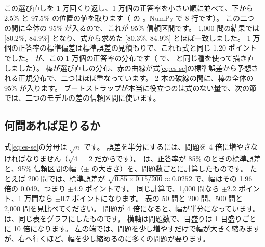 この選び直しを 1 万回くり返し、1 万個の正答率を小さい順に並べて、下から 2.5\% と 97.5\% の位置の値を取ります（ の 。NumPy で 8 行です）。
この二つの間に全体の 95\% が入るので、これが 95\% 信頼区間です。
1,000 問の結果では [80.2\%, 84.9\%] となり、式から求めた [80.3\%, 84.9\%] とほぼ一致しました。
1 万個の正答率の標準偏差は標準誤差の見積もりで、これも式と同じ 1.20 ポイントでした。
が、この 1 万個の正答率の分布です（ で、 と同じ種を使って描き直しました）。
棒が選び直しの分布、赤の曲線が式\eqref{eq:es-se}の標準誤差から予想される正規分布で、二つはほぼ重なっています。
2 本の破線の間に、棒の全体の 95\% が入ります。
ブートストラップが本当に役立つのは式のない量で、次の節では、二つのモデルの差の信頼区間に使います。

\subsection*{何問あれば足りるか}

式\eqref{eq:es-se}の分母は $\sqrt{n}$ です。
誤差を半分にするには、問題を 4 倍に増やさなければなりません（$\sqrt4=2$ だからです）。
は、正答率が 85\% のときの標準誤差と、95\% 信頼区間の幅（$\pm$ の大きさ）を、問題数ごとに計算したものです。
たとえば 200 問では、標準誤差が $\sqrt{0.85\times0.15/200}\approx0.0252$ で、幅はその 1.96 倍の 0.049、つまり $\pm4.9$ ポイントです。
同じ計算で、1,000 問なら $\pm2.2$ ポイント、1 万問なら $\pm0.7$ ポイントになります。
表の 50 問と 200 問、500 問と 2,000 問を見比べてください。
問題が 4 倍になると、幅が半分になっています。
は、同じ表をグラフにしたものです。
横軸は問題数で、目盛りは 1 目盛りごとに 10 倍になります。
左の端では、問題を少し増やすだけで幅が大きく縮みますが、右へ行くほど、幅を少し縮めるのに多くの問題が要ります。

